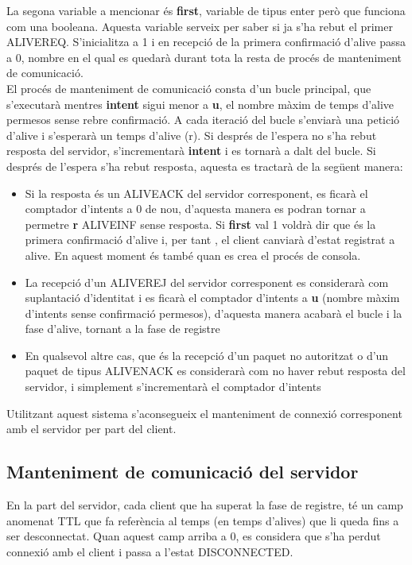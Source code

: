 \documentclass{article}
\begin{document}
La segona variable a mencionar és \textbf{first}, variable de tipus enter
però que funciona com una booleana. Aquesta variable serveix per saber si
ja s'ha rebut el primer ALIVE\textunderscore REQ. S'inicialitza a 1 i 
en recepció de la primera confirmació d'alive passa a 0, nombre en 
el qual es quedarà durant tota la resta de procés de manteniment 
de comunicació.\\

El procés de manteniment de comunicació consta d'un bucle principal, 
que s'executarà mentres \textbf{intent} sigui menor a \textbf{u}, 
el nombre màxim de temps d'alive permesos sense rebre confirmació.  
A cada iteració del bucle s'enviarà una petició d'alive i s'esperarà
un temps d'alive (r). Si després de l'espera no s'ha rebut resposta
del servidor, s'incrementarà \textbf{intent} i es tornarà a dalt del
bucle. Si després de l'espera s'ha rebut resposta, aquesta es tractarà
de la següent manera:
\begin{itemize}
\item Si la resposta és un ALIVE\textunderscore ACK 
del servidor corresponent, es ficarà el comptador d'intents a 0 de 
nou, d'aquesta manera es podran tornar a permetre \textbf{r} 
ALIVE\textunderscore INF sense resposta. Si \textbf{first} val 1 voldrà 
dir que és la primera confirmació d'alive i, per tant
, el client canviarà d'estat registrat a alive. En aquest moment és
també quan es crea el procés de consola. 
\item La recepció d'un ALIVE\textunderscore REJ del servidor corresponent
es considerarà com suplantació d'identitat i es ficarà el comptador 
d'intents a \textbf{u} (nombre màxim d'intents sense confirmació 
permesos), d'aquesta manera acabarà el bucle i la fase d'alive, tornant 
a la fase de registre
\item En qualsevol altre cas, que és la recepció d'un paquet no autoritzat
o d'un paquet de tipus ALIVE\textunderscore NACK es considerarà com no haver 
rebut resposta del servidor, i simplement s'incrementarà el comptador d'intents
\end{itemize}
Utilitzant aquest sistema s'aconsegueix el manteniment de connexió  corresponent 
amb el servidor per part del client.
\newpage 

\subsection{Manteniment de comunicació del servidor}

En la part del servidor, cada client que ha superat la fase de registre, té un camp
anomenat TTL que fa referència al temps (en temps d'alives) que li queda fins a ser 
desconnectat. Quan aquest camp arriba a 0, es considera que s'ha perdut connexió amb
el client i passa a l'estat DISCONNECTED.\\
\end{document}

